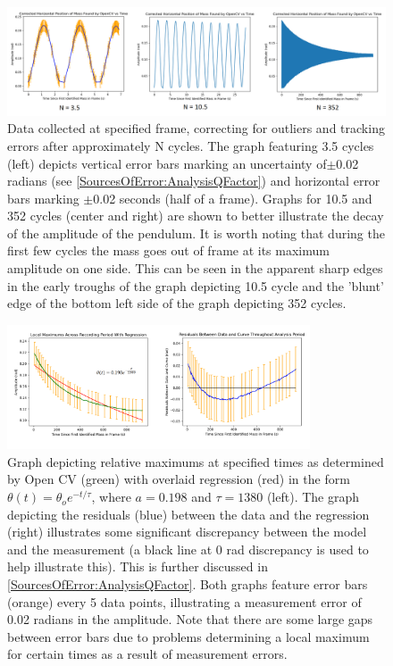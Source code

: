 \documentclass[11pt]{article}
\begin{document}
        \begin{figure}[H]
            \centering\includegraphics[width = 1\textwidth]{correctedGraph.PNG}
            \caption{Data collected at specified frame, correcting for outliers and tracking errors after approximately N cycles. The graph featuring 3.5 cycles (left) depicts vertical error bars marking an uncertainty of$\pm$0.02 radians (see \ref{SourcesOfError:AnalysisQFactor}) and horizontal error bars marking $\pm$0.02 seconds (half of a frame). Graphs for 10.5 and 352 cycles (center and right) are shown to better illustrate the decay of the amplitude of the pendulum. It is worth noting that during the first few cycles the mass goes out of frame at its maximum amplitude on one side. This can be seen in the apparent sharp edges in the early troughs of the graph depicting 10.5 cycle and the 'blunt' edge of the bottom left side of the graph depicting 352 cycles.}
            \label{fig:correctedGraph}
        \end{figure}

        \begin{figure}[H]
            \centering\includegraphics[width = 0.8\textwidth]{tauGraph.PNG}
            \caption{Graph depicting relative maximums at specified times as determined by Open CV (green) with overlaid regression (red) in the form $\theta(t) = \theta_oe^{-t/\tau}$, where $a = 0.198$ and $\tau = 1380$ (left). The graph depicting the residuals (blue) between the data and the regression (right) illustrates some significant discrepancy between the model and the measurement (a black line at 0 rad discrepancy is used to help illustrate this). This is further discussed in \ref{SourcesOfError:AnalysisQFactor}. Both graphs feature error bars (orange) every 5 data points, illustrating a measurement error of 0.02 radians in the amplitude. Note that there are some large gaps between error bars due to problems determining a local maximum for certain times as a result of measurement errors.}
            \label{fig:bestFit}
        \end{figure}
\end{document}
